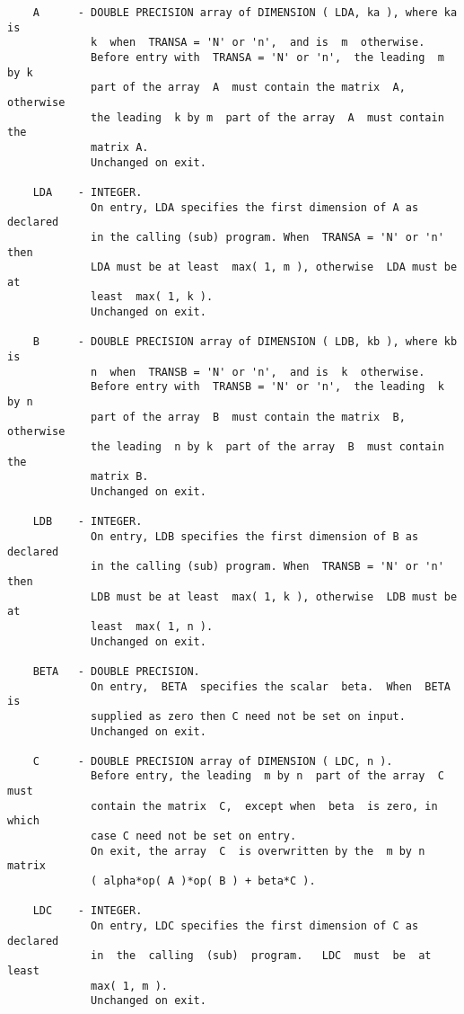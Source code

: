 \documentclass[10pt]{book}
\begin{document}
\begin{verbatim}
    A      - DOUBLE PRECISION array of DIMENSION ( LDA, ka ), where ka is
             k  when  TRANSA = 'N' or 'n',  and is  m  otherwise.
             Before entry with  TRANSA = 'N' or 'n',  the leading  m by k
             part of the array  A  must contain the matrix  A,  otherwise
             the leading  k by m  part of the array  A  must contain  the
             matrix A.
             Unchanged on exit.
 
    LDA    - INTEGER.
             On entry, LDA specifies the first dimension of A as declared
             in the calling (sub) program. When  TRANSA = 'N' or 'n' then
             LDA must be at least  max( 1, m ), otherwise  LDA must be at
             least  max( 1, k ).
             Unchanged on exit.
 
    B      - DOUBLE PRECISION array of DIMENSION ( LDB, kb ), where kb is
             n  when  TRANSB = 'N' or 'n',  and is  k  otherwise.
             Before entry with  TRANSB = 'N' or 'n',  the leading  k by n
             part of the array  B  must contain the matrix  B,  otherwise
             the leading  n by k  part of the array  B  must contain  the
             matrix B.
             Unchanged on exit.
 
    LDB    - INTEGER.
             On entry, LDB specifies the first dimension of B as declared
             in the calling (sub) program. When  TRANSB = 'N' or 'n' then
             LDB must be at least  max( 1, k ), otherwise  LDB must be at
             least  max( 1, n ).
             Unchanged on exit.
 
    BETA   - DOUBLE PRECISION.
             On entry,  BETA  specifies the scalar  beta.  When  BETA  is
             supplied as zero then C need not be set on input.
             Unchanged on exit.
 
    C      - DOUBLE PRECISION array of DIMENSION ( LDC, n ).
             Before entry, the leading  m by n  part of the array  C must
             contain the matrix  C,  except when  beta  is zero, in which
             case C need not be set on entry.
             On exit, the array  C  is overwritten by the  m by n  matrix
             ( alpha*op( A )*op( B ) + beta*C ).
 
    LDC    - INTEGER.
             On entry, LDC specifies the first dimension of C as declared
             in  the  calling  (sub)  program.   LDC  must  be  at  least
             max( 1, m ).
             Unchanged on exit.
\end{verbatim}
\end{document}
